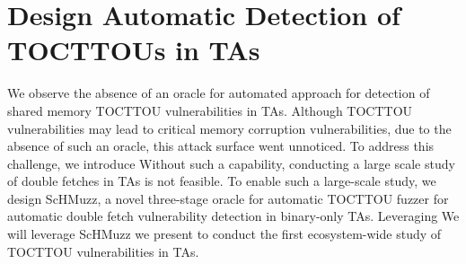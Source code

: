 \documentclass[conference]{IEEEtran} %
\newcommand{\sysname}{ScHMuzz\xspace}
\providecommand{\DIFaddtex}[1]{{\protect\color{blue} \sf #1}} %
\providecommand{\DIFdeltex}[1]{{\protect\color{red} \scriptsize #1}} %
\providecommand{\DIFaddbegin}{} %
\providecommand{\DIFaddend}{} %
\providecommand{\DIFdelbegin}{} %
\providecommand{\DIFdelend}{} %
\providecommand{\DIFadd}[1]{\texorpdfstring{\DIFaddtex{#1}}{#1}} %
\providecommand{\DIFdel}[1]{\texorpdfstring{\DIFdeltex{#1}}{}} %
\begin{document}
\section{\DIFdelbegin \DIFdel{Design}\DIFdelend \DIFaddbegin \DIFadd{Automatic Detection of TOCTTOUs in TAs}\DIFaddend }\label{sec:design} 


We observe the absence of an \DIFdelbegin \DIFdel{oracle for }\DIFdelend \DIFaddbegin \DIFadd{automated approach for detection of }\DIFaddend shared memory TOCTTOU 
vulnerabilities in TAs. \DIFdelbegin \DIFdel{Although TOCTTOU vulnerabilities may lead to critical memory corruption vulnerabilities, due to the 
absence of such an oracle, this attack surface went unnoticed. 
To address this challenge, we introduce }\DIFdelend \DIFaddbegin \DIFadd{Without such a capability, conducting a large scale study of 
double fetches in TAs is not feasible. 
To enable such a large-scale study, we design }\DIFaddend \sysname, a \DIFdelbegin \DIFdel{novel }\DIFdelend three-stage \DIFdelbegin \DIFdel{oracle  
for automatic TOCTTOU }\DIFdelend \DIFaddbegin \DIFadd{fuzzer 
for automatic double fetch }\DIFaddend vulnerability detection in binary-only TAs. 
\DIFdelbegin \DIFdel{Leveraging }\DIFdelend \DIFaddbegin \DIFadd{We will leverage }\DIFaddend \sysname \DIFdelbegin \DIFdel{we present }\DIFdelend \DIFaddbegin \DIFadd{to conduct }\DIFaddend the first ecosystem-wide study of TOCTTOU 
vulnerabilities in TAs.
\end{document}
